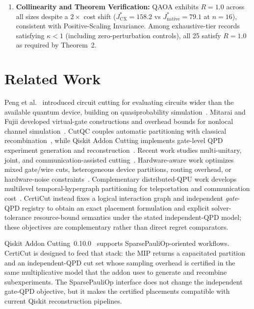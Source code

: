 \documentclass[11pt]{article}
\newcommand{\CertiCut}{CertiCut}
\newcommand{\CertiCut}{\textsc{CertiCut}}
\begin{document}
\begin{enumerate}
  \item \textbf{Collinearity and Theorem Verification:} QAOA exhibits $R=1.0$ across all sizes despite a $2\times$ cost shift ($J^*_{\mathrm{CX}}=158.2$ vs $J^*_{\mathrm{native}}=79.1$ at $n=16$), consistent with Positive-Scaling Invariance. Among exhaustive-tier records satisfying $\kappa < 1$ (including zero-perturbation controls), all 25 satisfy $R=1.0$ as required by Theorem~2.
\end{enumerate}

\section{Related Work}

Peng et al.~\cite{peng2020} introduced circuit cutting for evaluating circuits wider than the available quantum device, building on quasiprobability simulation~\cite{bravyi2016}. Mitarai and Fujii developed virtual-gate constructions and overhead bounds for nonlocal channel simulation~\cite{mitarai2021,mitarai2021overhead}. CutQC couples automatic partitioning with classical recombination~\cite{tang2021}, while Qiskit Addon Cutting implements gate-level QPD experiment generation and reconstruction~\cite{qiskitcutting}. Recent work studies multi-unitary, joint, and communication-assisted cutting~\cite{schmitt2025,piveteau2022,ufrecht2024,ufrecht2023,piveteau2024,piveteau2025sideinfo,brenner2025,lowe2023,li2024,shotqc2024,golden2023,gentinetta2024,carrera2024,harrowlowe2025}.
Hardware-aware work optimizes mixed gate/wire cuts, heterogeneous device partitions, routing overhead, or hardware-noise constraints~\cite{mosaiqc2026,tw2s2026,pal2026noise}. Complementary distributed-QPU work develops multilevel temporal-hypergraph partitioning for teleportation and communication cost~\cite{burt2026}. \CertiCut{} instead fixes a logical interaction graph and independent \emph{gate}-QPD registry to obtain an exact placement formulation and explicit solver-tolerance resource-bound semantics under the stated independent-QPD model; these objectives are complementary rather than direct regret comparators.

Qiskit Addon Cutting~0.10.0~\cite{qiskitcutting} supports SparsePauliOp-oriented workflows. \CertiCut{} is designed to feed that stack: the MIP returns a capacitated partition and an independent-QPD cut set whose sampling overhead is certified in the same multiplicative model that the addon uses to generate and recombine subexperiments. The SparsePauliOp interface does not change the independent gate-QPD objective, but it makes the certified placements compatible with current Qiskit reconstruction pipelines.
\end{document}

